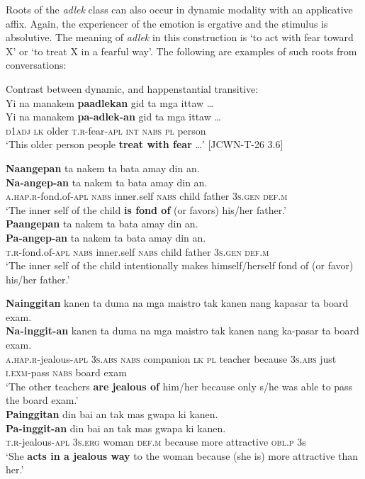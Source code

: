 Roots of the \textit{adlek} class can also occur in dynamic modality with an applicative affix. Again, the experiencer of the emotion is ergative and the stimulus is absolutive. The meaning of \textit{adlek} in this construction is ‘to act with fear toward X’ or ‘to treat X in a fearful way’. The following are examples of such roots from conversations:

\ea
Contrast between dynamic, and happenstantial transitive: \\
Yi  na  manakem  \textbf{paadlekan}  gid  ta  mga  ittaw … \\\smallskip
\gll Yi  na  manakem  \textbf{pa-adlek-an}  gid  ta  mga  ittaw … \\
\textsc{d1adj}  \textsc{lk}  older  \textsc{t.r}-fear-\textsc{apl}  \textsc{int}  \textsc{nabs}  \textsc{pl}  person \\
\glt ‘This older person people \textbf{treat with fear} …’ [JCWN-T-26 3.6]
\z

\ea
    \ea
    \textbf{Naangepan}  ta  nakem  ta  bata  amay  din  an. \\\smallskip
\gll \textbf{Na-angep-an}  ta  nakem  ta  bata  amay  din  an. \\
    \textsc{a.hap.r}-fond.of-\textsc{apl}  \textsc{nabs}  inner.self  \textsc{nabs}  child  father  3\textsc{s.gen}  \textsc{def.m} \\
    \glt ‘The inner self of the child \textbf{is fond of} (or favors) his/her father.’ \\
    \ex
    \textbf{Paangepan}  ta  nakem  ta  bata  amay  din  an. \\\smallskip
\gll \textbf{Pa-angep-an}  ta  nakem  ta  bata  amay  din  an. \\
    \textsc{t.r}-fond.of-\textsc{apl}  \textsc{nabs}  inner.self  \textsc{nabs}  child  father  3\textsc{s.gen}  \textsc{def.m} \\
    \glt ‘The inner self of the child intentionally makes himself/herself fond of (or favor) his/her father.’
    \z
\z

\newpage
\ea
    \ea 
    \textbf{Nainggitan}  kanen  ta  duma  na  mga  maistro tak  kanen  nang  kapasar  ta  board  exam. \\\smallskip
\gll \textbf{Na-inggit-an}  kanen  ta  duma  na  mga  maistro tak  kanen  nang  ka-pasar  ta  board  exam. \\
    \textsc{a.hap.r}-jealous-\textsc{apl}  3\textsc{s.abs}  \textsc{nabs}  companion  \textsc{lk}  \textsc{pl}  teacher
    because  3\textsc{s.abs} just \textsc{i.exm}-pass  \textsc{nabs}  board  exam \\
    \glt ‘The other teachers \textbf{are jealous of} him/her because only s/he was able to pass the board exam.’ \\
    \ex
    \textbf{Painggitan}  din  bai  an  tak  mas  gwapa  ki  kanen. \\\smallskip
\gll \textbf{Pa-inggit-an}  din  bai  an  tak  mas  gwapa  ki  kanen. \\
    \textsc{t.r}-jealous-\textsc{apl}  3\textsc{s.erg}  woman  \textsc{def.m}  because  more  attractive  \textsc{obl.p}  3s \\
    \glt ‘She \textbf{acts in a jealous way} to the woman because (she is) more attractive than her.’
    \z
\z

